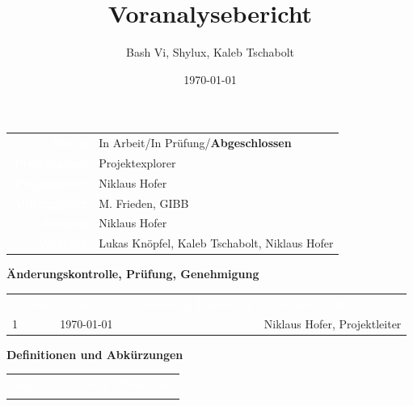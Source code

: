 \documentclass[10pt,paper=a4,final]{scrartcl}
\title{Voranalysebericht}
\author{Bash Vi, Shylux, Kaleb Tschabolt}
\date{\today}
\begin{document}
\maketitle
\newpage
\begin{tabularx}{\textwidth}{ r X }	%
  \textcolor{white}{{\bf Status}}\cellcolor{blue!80!} & In Arbeit/In Prüfung/{\bf Abgeschlossen}\cellcolor{blue!20!} \\
\textcolor{white}{{\bf Projektname}}\cellcolor{blue!80!} & Projektexplorer\cellcolor{blue!20!} \\
\textcolor{white}{{\bf Projektleiter}}\cellcolor{blue!80!} & Niklaus Hofer\cellcolor{blue!20!} \\
\textcolor{white}{{\bf Auftraggeber}}\cellcolor{blue!80!} & M. Frieden, GIBB\cellcolor{blue!20!} \\
\textcolor{white}{{\bf Autoren}}\cellcolor{blue!80!} & Niklaus Hofer\cellcolor{blue!20!} \\
\textcolor{white}{{\bf Verteiler}}\cellcolor{blue!80!} & Lukas Knöpfel, Kaleb Tschabolt, Niklaus Hofer\cellcolor{blue!20!}
\end{tabularx}
\newline
\newline
\newline
{\bf Änderungskontrolle, Prüfung, Genehmigung}
\newline

\begin{tabularx}{\textwidth}{l l X X}
\textcolor{white}{Version}\cellcolor{blue!80!} & \textcolor{white}{Datum}\cellcolor{blue!80!} & \textcolor{white}{Beschreibung, Bemerkung}\cellcolor{blue!80!} & \textcolor{white}{Name oder Rolle}\cellcolor{blue!80!} \\
\cellcolor{blue!20!} 1& \cellcolor{blue!20!} \today{} & \cellcolor{blue!20!} & Niklaus Hofer, Projektleiter\cellcolor{blue!20!} \\
\end{tabularx}
\newline
\newline
\newline
{\bf Definitionen und Abkürzungen}
\newline

\begin{tabularx}{\textwidth}{l X}
\textcolor{white}{Begriff/ Abkürzung}\cellcolor{blue!80!} & \textcolor{white}{Bedeutung}\cellcolor{blue!80!} \\
\cellcolor{blue!20!} & \cellcolor{blue!20!} \\
\end{tabularx}
\newline
\newline
\newline

{}
\flushleft
\newpage
\tableofcontents
\newpage
\end{document}
